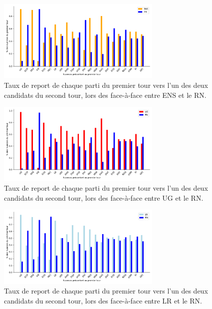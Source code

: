 \documentclass[11pt]{article}
\begin{document}
            \begin{figure}
                \begin{center}
                    \includegraphics[width=0.7\textwidth]{Focus_ENS_RN.pdf}
                    \caption{Taux de report de chaque parti du premier tour vers l'un des deux candidats du second tour, lors des face-à-face entre ENS et le RN.}
                    \label{fig:ENS-RN}
                \end{center}
            \end{figure}
            \begin{figure}
                \begin{center}
                    \includegraphics[width=0.7\textwidth]{Focus_UG_RN.pdf}
                    \caption{Taux de report de chaque parti du premier tour vers l'un des deux candidats du second tour, lors des face-à-face entre UG et le RN.}
                    \label{fig:UG-RN}
                \end{center}
            \end{figure}
            \begin{figure}
                \begin{center}
                    \includegraphics[width=0.7\textwidth]{Focus_LR_RN.pdf}
                    \caption{Taux de report de chaque parti du premier tour vers l'un des deux candidats du second tour, lors des face-à-face entre LR et le RN.}
                    \label{fig:LR-RN}
                \end{center}
            \end{figure}
\end{document}
